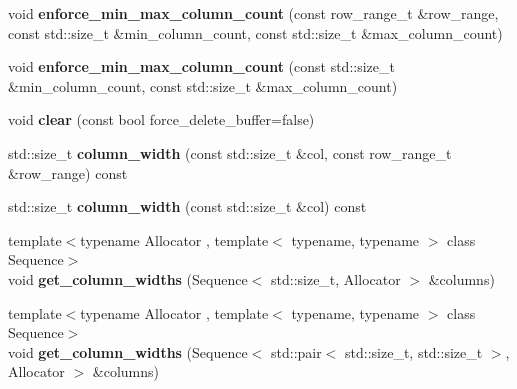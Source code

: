 \begin{DoxyCompactItemize}
\item 
\hypertarget{classstrtk_1_1token__grid_a330338d2e63c1caa255f4684dbc59d3d}{void {\bfseries enforce\-\_\-min\-\_\-max\-\_\-column\-\_\-count} (const row\-\_\-range\-\_\-t \&row\-\_\-range, const std\-::size\-\_\-t \&min\-\_\-column\-\_\-count, const std\-::size\-\_\-t \&max\-\_\-column\-\_\-count)}\label{classstrtk_1_1token__grid_a330338d2e63c1caa255f4684dbc59d3d}

\item 
\hypertarget{classstrtk_1_1token__grid_a59142ea6440863ecf29d25dc01b2464c}{void {\bfseries enforce\-\_\-min\-\_\-max\-\_\-column\-\_\-count} (const std\-::size\-\_\-t \&min\-\_\-column\-\_\-count, const std\-::size\-\_\-t \&max\-\_\-column\-\_\-count)}\label{classstrtk_1_1token__grid_a59142ea6440863ecf29d25dc01b2464c}

\item 
\hypertarget{classstrtk_1_1token__grid_a2c1b0d9ae376704ed38baf9c1d654079}{void {\bfseries clear} (const bool force\-\_\-delete\-\_\-buffer=false)}\label{classstrtk_1_1token__grid_a2c1b0d9ae376704ed38baf9c1d654079}

\item 
\hypertarget{classstrtk_1_1token__grid_a912d800d904f662c95772c6897b34dbb}{std\-::size\-\_\-t {\bfseries column\-\_\-width} (const std\-::size\-\_\-t \&col, const row\-\_\-range\-\_\-t \&row\-\_\-range) const }\label{classstrtk_1_1token__grid_a912d800d904f662c95772c6897b34dbb}

\item 
\hypertarget{classstrtk_1_1token__grid_a1ceb0af08c55420e0fb53491985ab3a4}{std\-::size\-\_\-t {\bfseries column\-\_\-width} (const std\-::size\-\_\-t \&col) const }\label{classstrtk_1_1token__grid_a1ceb0af08c55420e0fb53491985ab3a4}

\item 
\hypertarget{classstrtk_1_1token__grid_ac69a8b7b4b849a0ab1ec45deb5f74c2d}{{\footnotesize template$<$typename Allocator , template$<$ typename, typename $>$ class Sequence$>$ }\\void {\bfseries get\-\_\-column\-\_\-widths} (Sequence$<$ std\-::size\-\_\-t, Allocator $>$ \&columns)}\label{classstrtk_1_1token__grid_ac69a8b7b4b849a0ab1ec45deb5f74c2d}

\item 
\hypertarget{classstrtk_1_1token__grid_aaabc19953917af9e17862c205320a77f}{{\footnotesize template$<$typename Allocator , template$<$ typename, typename $>$ class Sequence$>$ }\\void {\bfseries get\-\_\-column\-\_\-widths} (Sequence$<$ std\-::pair$<$ std\-::size\-\_\-t, std\-::size\-\_\-t $>$, Allocator $>$ \&columns)}\label{classstrtk_1_1token__grid_aaabc19953917af9e17862c205320a77f}


\end{DoxyCompactItemize}
